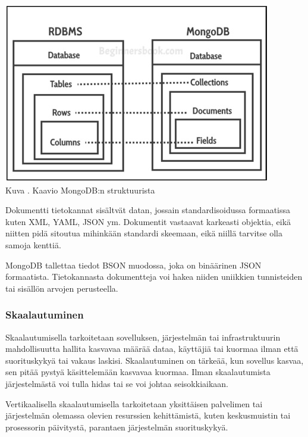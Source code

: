 \bigskip
\includegraphics{src/public/oppar/mongodb-structure.jpg} \\
Kuva \getImgCount. Kaavio MongoDB:n struktuurista
\medskip


Dokumentti tietokannat sisältvät datan, jossain standardisoidussa formaatissa kuten XML, YAML, JSON ym.
Dokumentit vastaavat karkeasti objektia, eikä niitten pidä sitoutua mihinkään standardi skeemaan, 
eikä niillä tarvitse olla samoja kenttiä.
\medskip


MongoDB tallettaa tiedot BSON muodossa, joka on binäärinen JSON formaatista.
Tietokannasta dokumentteja voi hakea niiden uniikkien tunnisteiden tai sisällön arvojen perusteella.
\medskip






\subsubsection{Skaalautuminen}




Skaalautumisella tarkoitetaan sovelluksen, järjestelmän tai infrastruktuurin
mahdollisuutta hallita kasvavaa määrää dataa, käyttäjiä tai kuormaa ilman että suorituskykyä tai vakaus laskisi.
Skaalautuminen on tärkeää, kun sovellus kasvaa, sen pitää pystyä käsittelemään kasvavaa kuormaa.
Ilman skaalautumista järjestelmästä voi tulla hidas tai se voi johtaa seisokkiaikaan.
\medskip

Vertikaalisella skaalautumisella tarkoitetaan yksittäisen palvelimen tai järjestelmän olemassa olevien resurssien kehittämistä, 
kuten keskusmuistin tai prosessorin päivitystä, parantaen järjestelmän suorituskykyä.
\medskip

